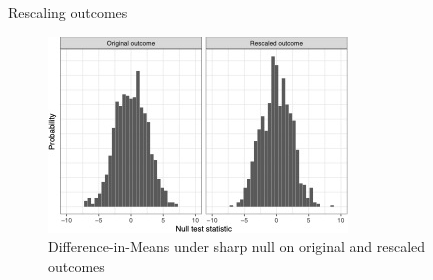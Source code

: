 \documentclass[table, xcolor = {dvipsnames}, 9pt]{beamer}
\theoremstyle{plain}
\begin{document}
\begin{frame}{Rescaling outcomes} \vfill
\begin{figure}[H]
\includegraphics[width = \linewidth]{images/null_dist_mean_diff_vs_mean_gain_diff.jpg}
\caption{Difference-in-Means under sharp null on original and rescaled outcomes}
\end{figure}
\end{frame}
\end{document}
